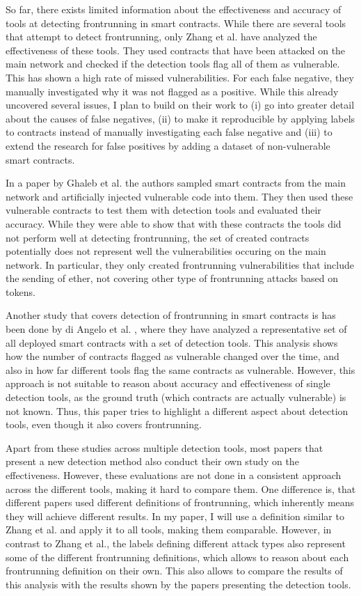 \documentclass[paper=a4,fontsize=11pt,oneside,titlepage]{scrartcl}
\begin{document}
So far, there exists limited information about the effectiveness and accuracy of tools at detecting frontrunning in smart contracts. While there are several tools that attempt to detect frontrunning, only Zhang et al. \cite{zhang_combatting_2023} have analyzed the effectiveness of these tools. They used contracts that have been attacked on the main network and checked if the detection tools flag all of them as vulnerable. This has shown a high rate of missed vulnerabilities. For each false negative, they manually investigated why it was not flagged as a positive. While this already uncovered several issues, I plan to build on their work to (i) go into greater detail about the causes of false negatives, (ii) to make it reproducible by applying labels to contracts instead of manually investigating each false negative and (iii) to extend the research for false positives by adding a dataset of non-vulnerable smart contracts.

In a paper by Ghaleb et al.\cite{ghaleb_how_2020} the authors sampled smart contracts from the main network and artificially injected vulnerable code into them. They then used these vulnerable contracts to test them with detection tools and evaluated their accuracy. While they were able to show that with these contracts the tools did not perform well at detecting frontrunning, the set of created contracts potentially does not represent well the vulnerabilities occuring on the main network. In particular, they only created frontrunning vulnerabilities that include the sending of ether, not covering other type of frontrunning attacks based on tokens.

Another study that covers detection of frontrunning in smart contracts is has been done by di Angelo et al. \cite{di_angelo_evolution_2023}, where they have analyzed a representative set of all deployed smart contracts with a set of detection tools. This analysis shows how the number of contracts flagged as vulnerable changed over the time, and also in how far different tools flag the same contracts as vulnerable. However, this approach is not suitable to reason about accuracy and effectiveness of single detection tools, as the ground truth (which contracts are actually vulnerable) is not known. Thus, this paper tries to highlight a different aspect about detection tools, even though it also covers frontrunning.

Apart from these studies across multiple detection tools, most papers that present a new detection method also conduct their own study on the effectiveness. However, these evaluations are not done in a consistent approach across the different tools, making it hard to compare them. One difference is, that different papers used different definitions of frontrunning, which inherently means they will achieve different results. In my paper, I will use a definition similar to Zhang et al.\cite{zhang_combatting_2023} and apply it to all tools, making them comparable. However, in contrast to Zhang et al., the labels defining different attack types also represent some of the different frontrunning definitions, which allows to reason about each frontrunning definition on their own. This also allows to compare the results of this analysis with the results shown by the papers presenting the detection tools.
\end{document}
